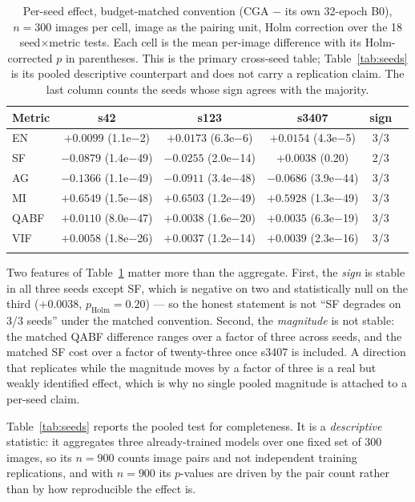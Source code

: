 \documentclass[pdflatex,sn-mathphys-num]{sn-jnl}
\theoremstyle{thmstyleone}%
\theoremstyle{thmstyletwo}%
\theoremstyle{thmstylethree}%
\begin{document}
\begin{table}[t]
\caption{Per-seed effect, budget-matched convention (CGA $-$ its own 32-epoch B0), $n = 300$ images per cell, image as the pairing unit, Holm correction over the 18 seed$\times$metric tests. Each cell is the mean per-image difference with its Holm-corrected $p$ in parentheses. This is the primary cross-seed table; Table~\ref{tab:seeds} is its pooled descriptive counterpart and does not carry a replication claim. The last column counts the seeds whose sign agrees with the majority.}
\label{tab:perseed}%
\footnotesize
\setlength{\tabcolsep}{4pt}
\begin{tabular}{@{}lccccl@{}}
\toprule
Metric & s42 & s123 & s3407 & sign \\
\midrule
EN   & $+0.0099$ (1.1e$-$2)  & $+0.0173$ (6.3e$-$6)  & $+0.0154$ (4.3e$-$5)  & 3/3 \\
SF   & $-0.0879$ (1.4e$-$49) & $-0.0255$ (2.0e$-$14) & $+0.0038$ (0.20)      & 2/3 \\
AG   & $-0.1366$ (1.1e$-$49) & $-0.0911$ (3.4e$-$48) & $-0.0686$ (3.9e$-$44) & 3/3 \\
MI   & $+0.6549$ (1.5e$-$48) & $+0.6503$ (1.2e$-$49) & $+0.5928$ (1.3e$-$49) & 3/3 \\
QABF & $+0.0110$ (8.0e$-$47) & $+0.0038$ (1.6e$-$20) & $+0.0035$ (6.3e$-$19) & 3/3 \\
VIF  & $+0.0058$ (1.8e$-$26) & $+0.0037$ (1.2e$-$14) & $+0.0039$ (2.3e$-$16) & 3/3 \\
\botrule
\end{tabular}
\end{table}

Two features of Table~\ref{tab:perseed} matter more than the aggregate. First, the \emph{sign} is stable in all three seeds except SF, which is negative on two and statistically null on the third ($+0.0038$, $p_{\mathrm{Holm}} = 0.20$) --- so the honest statement is not ``SF degrades on 3/3 seeds'' under the matched convention. Second, the \emph{magnitude} is not stable: the matched QABF difference ranges over a factor of three across seeds, and the matched SF cost over a factor of twenty-three once s3407 is included. A direction that replicates while the magnitude moves by a factor of three is a real but weakly identified effect, which is why no single pooled magnitude is attached to a per-seed claim.

Table~\ref{tab:seeds} reports the pooled test for completeness. It is a \emph{descriptive} statistic: it aggregates three already-trained models over one fixed set of 300 images, so its $n = 900$ counts image pairs and not independent training replications, and with $n = 900$ its $p$-values are driven by the pair count rather than by how reproducible the effect is.
\end{document}
